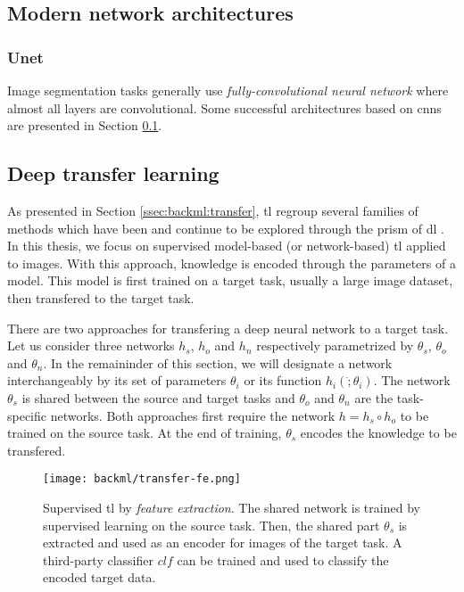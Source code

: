 

\subsection{Modern network architectures}
\label{ssec:backml:dl:modernarchi}

\subsubsection{Unet}

Image segmentation tasks generally use \textit{fully-convolutional neural network} where almost all layers are convolutional. Some successful architectures based on \acrshort{cnn}s are presented in Section \ref{ssec:backml:dl:modernarchi}. 


\subsection{Deep transfer learning}
\label{ssec:backml:dl:deeptransfer}

As presented in Section \ref{ssec:backml:transfer}, \acrlong{tl} regroup several families of methods which have been and continue to be explored through the prism of \acrlong{dl} \parencite{tan2018survey}. In this thesis, we focus on supervised model-based (or network-based) \acrlong{tl} applied to images. With this approach, knowledge is encoded through the parameters of a model. This model is first trained on a target task, usually a large image dataset, then transfered to the target task.

There are two approaches for transfering a deep neural network to a target task. Let us consider three networks $h_s$, $h_o$ and $h_n$ respectively parametrized by $\theta_s$, $\theta_o$ and $\theta_n$. In the remaininder of this section, we will designate a network interchangeably by its set of parameters $\theta_i$ or its function $h_i(\dot;\theta_i)$. The network $\theta_s$ is shared between the source and target tasks and $\theta_o$ and $\theta_n$ are the task-specific networks. Both approaches first require the network $h = h_s \circ h_o$ to be trained on the source task. At the end of training, $\theta_s$ encodes the knowledge to be transfered. 

\begin{figure}
  \centering
  \texttt{[image: backml/transfer-fe.png]}
  \caption{Supervised \acrlong{tl} by \textit{feature extraction}. The shared network is trained by supervised learning on the source task. Then, the shared part $\theta_s$ is extracted and used as an encoder for images of the target task. A third-party classifier $clf$ can be trained and used to classify the encoded target data.}
  \label{fig:backml:transfer-fe}
\end{figure}

